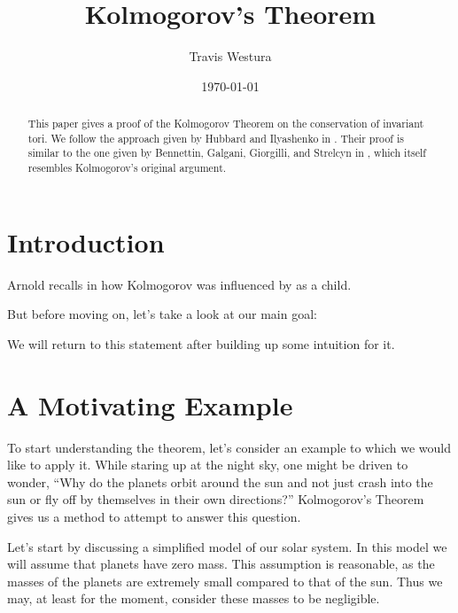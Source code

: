 \documentclass[twoside,letterpaper,10pt]{article}
\title{Kolmogorov's Theorem}
\author{Travis Westura}
\date{\today}
\numberwithin{equation}{section}
\begin{document}
\maketitle

\begin{abstract}
  This paper gives a proof of the Kolmogorov Theorem on the conservation of
  invariant tori.
  We follow the approach given by Hubbard and Ilyashenko in \cite{hi02}.
  Their proof is similar to the one given by Bennettin, Galgani, Giorgilli, and
  Strelcyn in \cite{bggs84}, which itself resembles Kolmogorov's original
  argument.
\end{abstract}


\section{Introduction}
\label{sec:introduction}


Arnold recalls in \cite{a97} how Kolmogorov was influenced by \cite{f64} as a
child.

But before moving on, let's take a look at our main goal:
\begin{thm}
  \label{thm:KAM}
  \KAM{}
\end{thm}
We will return to this statement after building up some intuition for it.

\section{A Motivating Example}
\label{sec:motivating-example}

To start understanding the theorem, let's consider an example to which we would
like to apply it.
While staring up at the night sky, one might be driven to wonder, ``Why do the
planets orbit around the sun and not just crash into the sun or fly off by
themselves in their own directions?''
Kolmogorov's Theorem gives us a method to attempt to answer this question.

Let's start by discussing a simplified model of our solar system.
In this model we will assume that planets have zero mass.
This assumption is reasonable, as the masses of the planets are extremely small
compared to that of the sun.
Thus we may, at least for the moment, consider these masses to be negligible.
\end{document}
